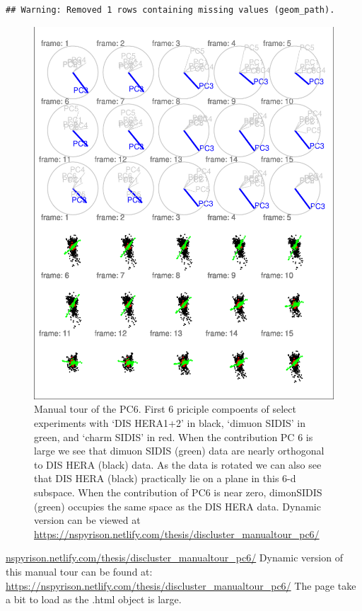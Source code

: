 \documentclass{monashthesis}
\begin{document}
\begin{verbatim}
## Warning: Removed 1 rows containing missing values (geom_path).
\end{verbatim}

\begin{figure}
\centering
\includegraphics{thesis_files/figure-latex/DISclusterGood-1.pdf}
\caption{\label{fig:DISclusterGood}Manual tour of the PC6. First 6 priciple
compoents of select experiments with `DIS HERA1+2' in black, `dimuon
SIDIS' in green, and `charm SIDIS' in red. When the contribution PC 6 is
large we see that dimuon SIDIS (green) data are nearly orthogonal to DIS
HERA (black) data. As the data is rotated we can also see that DIS HERA
(black) practically lie on a plane in this 6-d subspace. When the
contribution of PC6 is near zero, dimonSIDIS (green) occupies the same
space as the DIS HERA data. Dynamic version can be viewed at
\url{https://nspyrison.netlify.com/thesis/discluster_manualtour_pc6/}}
\end{figure}

\href{https://nspyrison.netlify.com/thesis/discluster_manualtour_pc6/}{nspyrison.netlify.com/thesis/discluster\_manualtour\_pc6/}
Dynamic version of this manual tour can be found at:
\url{https://nspyrison.netlify.com/thesis/discluster_manualtour_pc6/}
The page take a bit to load as the .html object is large.
\end{document}
